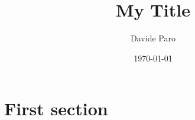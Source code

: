 \documentclass[italian]{article}
\title{My Title}
\author{Davide Paro}
\date{\today}
\begin{document}
\maketitle
\begin{abstract}
    \lipsum[1]
\end{abstract}
\tableofcontents


\section{First section}
\lipsum[2]
\end{document}
